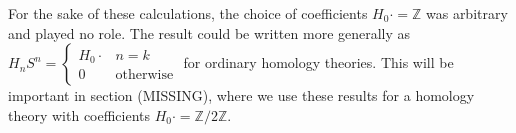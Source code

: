 \begin{remark}
For the sake of these calculations, the choice of coefficients $H_0\cdot=\mathbb{Z}$ was arbitrary and played no role. The result could be written more generally as $H_nS^n=\begin{cases}H_0\cdot & n=k\\0 & \text{otherwise}\end{cases}$ for ordinary homology theories. This will be important in section (MISSING), where we use these results for a homology theory with coefficients $H_0 \cdot=\mathbb{Z}/2\mathbb{Z}$.
\end{remark}